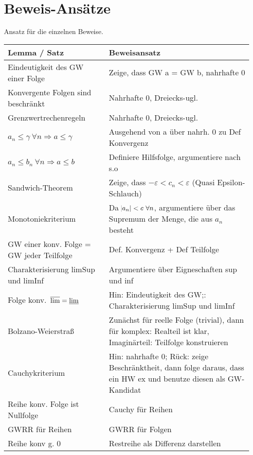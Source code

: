 \documentclass[10pt]{report}
\begin{document}
    \section{Beweis-Ansätze}
    Ansatz für die einzelnen Beweise.
    \begin{center}
        \begin{longtable}{lp{6cm}}
            \toprule
                Lemma / Satz & Beweisansatz\\
            \midrule
                Eindeutigkeit des GW einer Folge & Zeige, dass GW a = GW b, nahrhafte 0\\
                Konvergente Folgen sind beschränkt & Nahrhafte 0, Dreiecks-ugl.\\
                Grenzwertrechenregeln & Nahrhafte 0, Dreiecks-ugl. \\
                $a_n \leq \gamma\ \forall n \Rightarrow a \leq \gamma$  & Ausgehend von a über nahrh. 0 zu Def Konvergenz \\
                $a_n \leq b_n\ \forall n \Rightarrow a\leq b$ & Definiere Hilfsfolge, argumentiere nach s.o \\
                Sandwich-Theorem & Zeige, dass $-\varepsilon < c_n < \varepsilon$  (Quasi Epsilon-Schlauch) \\
                Monotoniekriterium & Da $\abs{a_n} < c\ \forall n$, argumentiere über das Supremum der Menge, die aus $a_n$ besteht \\
                GW einer konv. Folge = GW jeder Teilfolge & Def. Konvergenz + Def Teilfolge \\
                Charakterisierung limSup und limInf & Argumentiere über Eigneschaften sup und inf \\
                Folge konv.\ $\varlimsup = \varliminf$ & Hin: Eindeutigkeit des GW;: Charakterisierung limSup und limInf \\
                Bolzano-Weierstraß & Zunächst für reelle Folge (trivial), dann für komplex: Realteil ist klar, Imaginärteil: Teilfolge konstruieren \\
                Cauchykriterium & Hin: nahrhafte 0; Rück: zeige Beschränktheit, dann folge daraus, dass ein HW ex und benutze diesen als GW-Kandidat \\
                Reihe konv.  Folge ist Nullfolge & Cauchy für Reihen \\
                GWRR für Reihen & GWRR für Folgen \\
                Reihe konv g. 0 & Restreihe als Differenz darstellen \\

\end{longtable}
\end{center}
\end{document}
